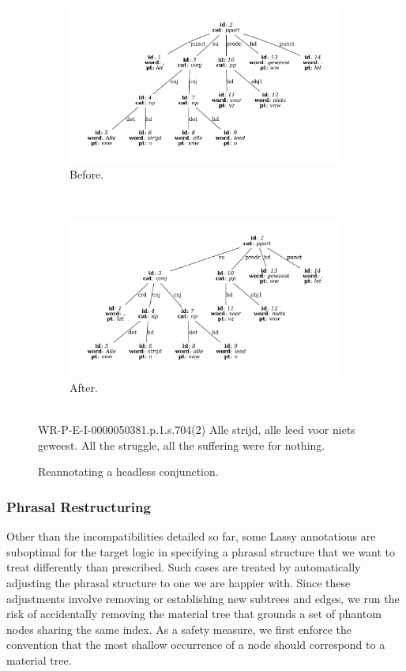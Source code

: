 \begin{figure}
	\centering
	\begin{subfigure}[b]{0.85\textwidth}
		\includegraphics[width=1\textwidth,trim={1.5cm 1.5cm 1.5cm 1.5cm}]{./prebuilt/p2crd_before.pdf}
		\caption{Before.}
	\end{subfigure}\\[\midsep]
	\begin{subfigure}[b]{0.85\textwidth}
			\includegraphics[width=1\textwidth,trim={1.5cm 1.5cm 1.5cm 1.5cm}]{./prebuilt/p2crd_after.pdf}
			\caption{After.}			
	\end{subfigure}\\[\smallsep]
	\lassycap
		{WR-P-E-I-0000050381.p.1.s.704(2)}
		{Alle strijd, alle leed voor niets geweest.}
		{All the struggle, all the suffering were for nothing.}
	\caption{Reannotating a headless conjunction.}
	\label{figure:p2crd}
\end{figure}

\subsubsection{Phrasal Restructuring}
Other than the incompatibilities detailed so far, some Lassy annotations are suboptimal for the target logic in specifying a phrasal structure that we want to treat differently than prescribed.
Such cases are treated by automatically adjusting the phrasal structure to one we are happier with.
Since these adjustments involve removing or establishing new subtrees and edges, we run the risk of accidentally removing the material tree that grounds a set of phantom nodes sharing the same index.
As a safety measure, we first enforce the convention that the most shallow occurrence of a node should correspond to a material tree.

